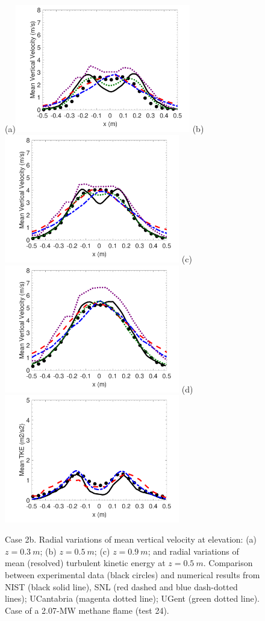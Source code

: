 \begin{figure}
\centering
(a)\includegraphics[height=2.2in]{Figures/Case2-Fig2a.pdf}
(b)\includegraphics[height=2.2in]{Figures/Case2-Fig2b.pdf}
(c)\includegraphics[height=2.2in]{Figures/Case2-Fig2c.pdf}
(d)\includegraphics[height=2.2in]{Figures/Case2-Fig2d.pdf}
\caption{Case 2b. Radial variations of mean vertical velocity at elevation: (a) $z = 0.3~m$; (b) $z = 0.5~m$; (c) $z = 0.9~m$; and radial variations of mean (resolved) turbulent kinetic energy at $z = 0.5~m$. Comparison between experimental data (black circles) and numerical results from NIST (black solid line),  SNL (red dashed and blue dash-dotted  lines); UCantabria (magenta dotted line); UGent (green dotted line). Case of a 2.07-MW methane flame (test 24).}

\label{fig:Case2-Fig2}
\end{figure}
